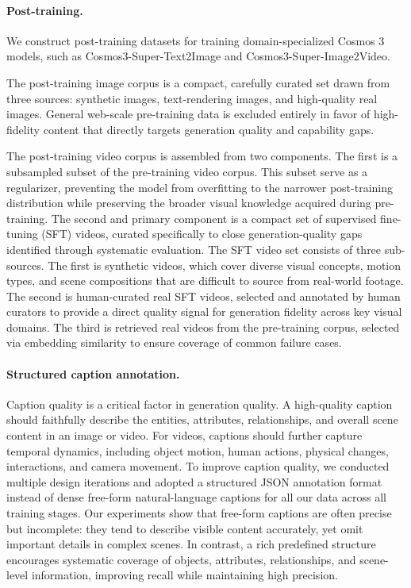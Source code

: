 \paragraph{Post-training.} We construct post-training datasets for training domain-specialized Cosmos 3 models, such as Cosmos3-Super-Text2Image and Cosmos3-Super-Image2Video.

The post-training image corpus is a compact, carefully curated set drawn from three sources: synthetic images, text-rendering images, and high-quality real images. General web-scale pre-training data is excluded entirely in favor of high-fidelity content that directly targets generation quality and capability gaps.


The post-training video corpus is assembled from two components. The first is a subsampled subset of the pre-training video corpus.
This subset serve as a regularizer, preventing the model from overfitting to the narrower post-training distribution while preserving the broader visual knowledge acquired during pre-training. The second and primary component is a compact set of supervised fine-tuning (SFT) videos, curated specifically to close generation-quality gaps identified through systematic evaluation. The SFT video set consists of three sub-sources. The first is synthetic videos, which cover diverse visual concepts, motion types, and scene compositions that are difficult to source from real-world footage. The second is human-curated real SFT videos, selected and annotated by human curators to provide a direct quality signal for generation fidelity across key visual domains. The third is retrieved real videos from the pre-training corpus, selected via embedding similarity to ensure coverage of common failure cases.

\paragraph{Structured caption annotation.}
Caption quality is a critical factor in generation quality. A high-quality caption should faithfully describe the entities, attributes, relationships, and overall scene content in an image or video. For videos, captions should further capture temporal dynamics, including object motion, human actions, physical changes, interactions, and camera movement. To improve caption quality, we conducted multiple design iterations and adopted a structured JSON annotation format instead of dense free-form natural-language captions for all our data across all training stages. Our experiments show that free-form captions are often precise but incomplete: they tend to describe visible content accurately, yet omit important details in complex scenes. In contrast, a rich predefined structure encourages systematic coverage of objects, attributes, relationships, and scene-level information, improving recall while maintaining high precision.

